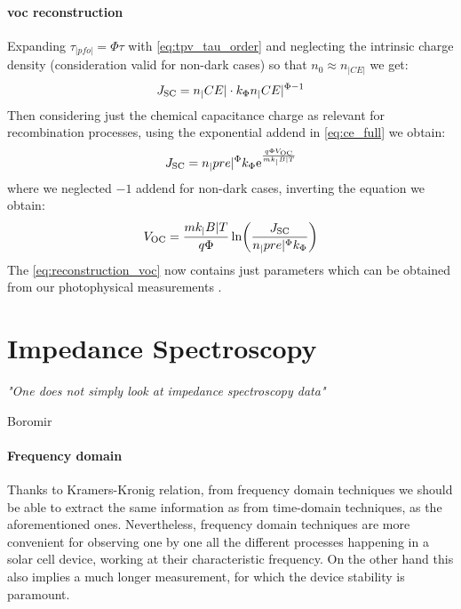 \paragraph{\Gls{voc} reconstruction}
Expanding $\tau_|pfo| = \Phi \tau$ with \cref{eq:tpv_tau_order} and neglecting the intrinsic charge density (consideration valid for non-dark cases) so that $n_0 \approx n_|CE|$ we get:
$$J_\mathrm{SC} = n_|CE| \cdot k_\Phi n_|CE|^{\Phi-1}$$
Then considering just the chemical capacitance charge as relevant for recombination processes, using the exponential addend in \cref{eq:ce_full} we obtain:
$$J_\mathrm{SC} = n_|pre|^\Phi k_\Phi \mathrm{e}^{\frac{q \Phi V_\mathrm{OC}}{m k_|B| T}}$$
where we neglected $-1$ addend for non-dark cases, inverting the equation we obtain:
\begin{equation}\label{eq:reconstruction_voc}
	V_\mathrm{OC} = \frac{m k_|B| T}{q \Phi} \ln( \frac{J_\mathrm{SC}}{n_|pre|^\Phi k_\Phi} )
\end{equation}
The \cref{eq:reconstruction_voc} now contains just parameters which can be obtained from our photophysical measurements \cite{Wheeler2015,Wheeler2017,Du2018}.

\section{Impedance Spectroscopy}
\epigraph{\textit{"One does not simply look at impedance spectroscopy data"}}{Boromir}

\paragraph{Frequency domain}
Thanks to Kramers-Kronig relation, from frequency domain techniques we should be able to extract the same information as from time-domain techniques, as the aforementioned ones.
Nevertheless, frequency domain techniques are more convenient for observing one by one all the different processes happening in a solar cell device, working at their characteristic frequency.
On the other hand this also implies a much longer measurement, for which the device stability is paramount.

